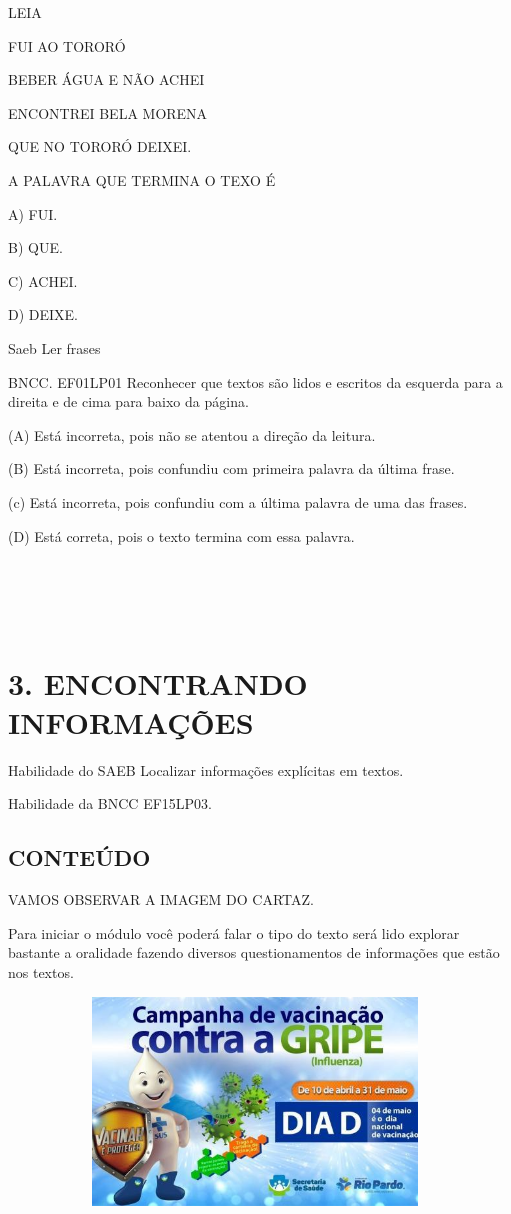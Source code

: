 LEIA

FUI AO TORORÓ

BEBER ÁGUA E NÃO ACHEI

ENCONTREI BELA MORENA

QUE NO TORORÓ DEIXEI.

A PALAVRA QUE TERMINA O TEXO É

A) FUI.

B) QUE.

C) ACHEI.

D) DEIXE.

Saeb Ler frases

BNCC. EF01LP01 Reconhecer que textos são lidos e escritos da esquerda
para a direita e de cima para baixo da página.

(A) Está incorreta, pois não se atentou a direção da leitura.

(B) Está incorreta, pois confundiu com primeira palavra da última frase.

(c) Está incorreta, pois confundiu com a última palavra de uma das
frases.

(D) Está correta, pois o texto termina com essa palavra.

\section{\texorpdfstring{\\
}{ }}\label{section-7}

\section{3. ENCONTRANDO
INFORMAÇÕES}\label{modulo-3-encontrando-informauxe7uxf5es}

\protect\hypertarget{_heading=h.lnxbz9}{}{}Habilidade do SAEB 
Localizar informações explícitas em textos.

Habilidade da BNCC 
EF15LP03.

\subsection{CONTEÚDO}\label{conteuxfado-2}

VAMOS OBSERVAR A IMAGEM DO CARTAZ.

\protect\hypertarget{_heading=h.35nkun2}{}{}Para iniciar o módulo você
poderá falar o tipo do texto será lido explorar bastante a oralidade
fazendo diversos questionamentos de informações que estão nos textos.

\includegraphics[width=5.14986in,height=2.17762in]{media/image124.jpg}

